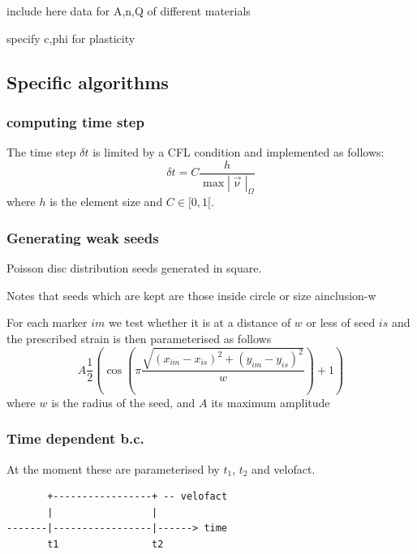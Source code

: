 \documentclass[a4paper]{article}
\begin{document}
include here data for A,n,Q of different materials

specify c,phi for plasticity



\subsection{Specific algorithms}

\subsubsection{computing time step}

The time step $\delta t$ is limited by a CFL condition and implemented
as follows:
\[
\delta t = C \frac{h}{\max |\vec\upnu|_\Omega}
\]
where $h$ is the element size and $C\in[0,1[$.

\subsubsection{Generating weak seeds}

Poisson disc distribution
seeds generated in square.

Notes that seeds which are kept are those inside circle or size ainclusion-w

For each marker $im$ we test whether it is at a distance of $w$ or less of 
seed $is$ and the prescribed strain is then parameterised as follows
\[
A \frac{1}{2} \left(\cos (\pi \frac{\sqrt{(x_{im}-x_{is})^2+(y_{im}-y_{is})^2}}{w}) +1 \right)
\]
where $w$ is the radius of the seed, and $A$ its maximum amplitude




\subsubsection{Time dependent b.c.}

At the moment these are parameterised by $t_1$, $t_2$ and velofact.

\begin{verbatim}
       +-----------------+ -- velofact
       |                 |
-------|-----------------|------> time
       t1                t2
\end{verbatim}
\end{document}
